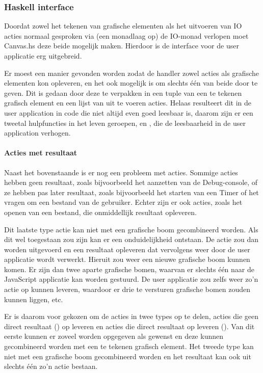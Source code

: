 \subsubsection{Haskell interface}
Doordat zowel het tekenen van grafische elementen als het uitvoeren van IO acties normaal gesproken via (een monadlaag op) de IO-monad verlopen moet Canvas.hs deze beide mogelijk maken. Hierdoor is de interface voor de user applicatie erg uitgebreid. 

Er moest een manier gevonden worden zodat de handler zowel acties als grafische elementen kon opleveren, en het ook mogelijk is om slechts één van beide door te geven. Dit is gedaan door deze te verpakken in een tuple van een te tekenen grafisch element en een lijst van uit te voeren acties. Helaas resulteert dit in de user application in code die niet altijd even goed leesbaar is, daarom zijn er een tweetal hulpfuncties in het leven geroepen,  en , die de leesbaarheid in de user application verhogen.

\paragraph{Acties met resultaat}
Naast het bovenstaande is er nog een probleem met acties. Sommige acties hebben geen resultaat, zoals bijvoorbeeld het aanzetten van de Debug-console, of ze hebben pas later resultaat, zoals bijvoorbeeld het starten van een Timer of het vragen om een bestand van de gebruiker. Echter zijn er ook acties, zoals het openen van een bestand, die onmiddellijk resultaat opleveren. 

Dit laatste type actie kan niet met een grafische boom gecombineerd worden. Als dit wel toegestaan zou zijn kan er een onduidelijkheid ontstaan. De actie zou dan worden uitgevoerd en een resultaat opleveren dat vervolgens weer door de user applicatie wordt verwerkt. Hieruit zou weer een nieuwe grafische boom kunnen komen. Er zijn dan twee aparte grafische bomen, waarvan er slechts één naar de JavaScript applicatie kan worden gestuurd. De user applicatie zou zelfs weer zo'n actie op kunnen leveren, waardoor er drie te versturen grafische bomen zouden kunnen liggen, etc. 

Er is daarom voor gekozen om de acties in twee types op te delen, acties die geen direct resultaat () op leveren en acties die direct resultaat op leveren (). Van dit eerste kunnen er zoveel worden opgegeven als gewenst en deze kunnen gecombineerd worden met een te tekenen grafisch element. Het tweede type kan niet met een grafische boom gecombineerd worden en het resultaat kan ook uit slechts één zo'n actie bestaan. 


